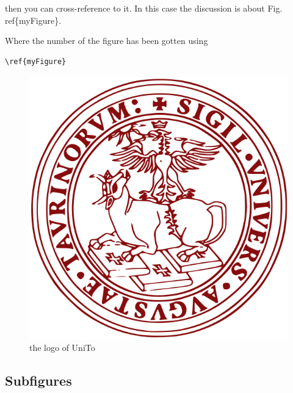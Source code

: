 then you can cross-reference to it. In this case the discussion is about Fig. \\ref\{myFigure\}.

Where the number of the figure has been gotten using 
\begin{verbatim} 
\ref{myFigure}
\end{verbatim} 


\begin{figure}[htb]
\centering

\includegraphics[scale=0.15]{pictures/logo.png}
\caption{the logo of UniTo}

\end{figure}

\subsection{Subfigures}

